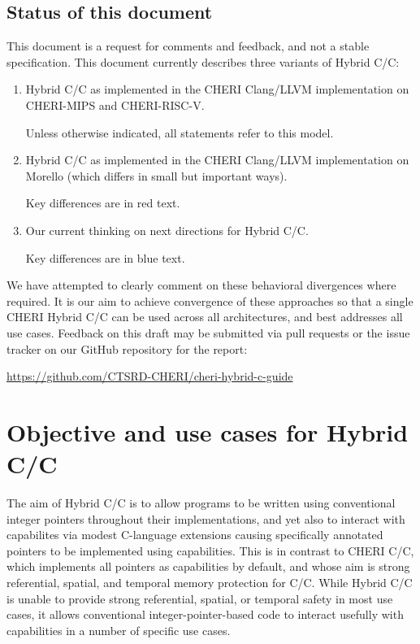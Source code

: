 \documentclass[12pt,twoside,openright,a4paper]{article}
\newcommand{\futurevariant}[1]{{\color{blue} #1}}
\newcommand{\morellovariant}[1]{{\color{red} #1}}
\newcommand*{\cpp}{\texorpdfstring{C\textsmaller[2]{\protect\nolinebreak[4]\hspace{-.05em}\raisebox{.45ex}{\textbf{++}}}}{C++}}
\newcommand*{\COrCpp}{C/\cpp{}}
\newcommand*{\purecapCOrCpp}{CHERI \COrCpp{}}
\newcommand*{\CHERIhybridCOrCpp}{CHERI Hybrid \COrCpp{}}
\newcommand*{\hybridCOrCpp}{Hybrid \COrCpp{}}
\begin{document}
\subsection{Status of this document}

This document is a request for comments and feedback, and not a stable
specification.
This document currently describes three variants of \hybridCOrCpp{}:

\begin{enumerate}
\item \hybridCOrCpp{} as implemented in the CHERI Clang/LLVM implementation on
  CHERI-MIPS and CHERI-RISC-V.

  Unless otherwise indicated, all statements refer to this model.

\item \hybridCOrCpp{} as implemented in the CHERI Clang/LLVM implementation on
  Morello (which differs in small but important ways).

  Key differences are in \morellovariant{red text}.

\item Our current thinking on next directions for \hybridCOrCpp{}.

  Key differences are in \futurevariant{blue text}.
\end{enumerate}

\noindent
We have attempted to clearly comment on these behavioral divergences where
required.
It is our aim to achieve convergence of these approaches so that a single
\CHERIhybridCOrCpp{} can be used across all architectures, and best addresses
all use cases.
Feedback on this draft may be submitted via pull requests or the issue tracker
on our GitHub repository for the report:

\smallskip

\url{https://github.com/CTSRD-CHERI/cheri-hybrid-c-guide}

\section{Objective and use cases for \hybridCOrCpp{}}

The aim of \hybridCOrCpp{} is to allow programs to be written using
conventional integer pointers throughout their implementations, and yet also
to interact with capabilites via modest C-language extensions causing
specifically annotated pointers to be implemented using capabilities.
This is in contrast to \purecapCOrCpp{}, which implements all pointers as
capabilities by default, and whose aim is strong referential, spatial, and
temporal memory protection for C/\cpp{}.
While \hybridCOrCpp{} is unable to provide strong referential, spatial, or
temporal safety in most use cases, it allows conventional
integer-pointer-based code to interact usefully with capabilities in a number
of specific use cases.
\end{document}
